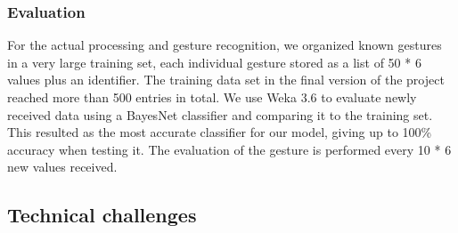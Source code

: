 \subsubsection{Evaluation}
For the actual processing and gesture recognition, we organized known gestures in a very large training set, each individual gesture stored as a list of 50 * 6 values plus an identifier. 
The training data set in the final version of the project reached more than 500 entries in total.
We use Weka 3.6 to evaluate newly received data using a BayesNet classifier and comparing it to the training set. 
This resulted as the most accurate classifier for our model, giving up to 100\% accuracy when testing it.
The evaluation of the gesture is performed every 10 * 6 new values received.

\subsection{Technical challenges}